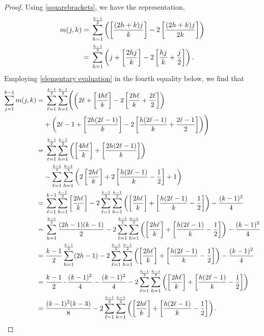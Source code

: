 \documentclass[11pt,reqno]{amsart}
\theoremstyle{plain}
\numberwithin{equation}{section}
\begin{document}
\begin{proof}
 Using \eqref{squarebrackets}, we have the representation,
\begin{align*}%
m(j,k)=&\; \sum_{h=1}^{\frac{k-1}{2}}\left(\left[\frac{(2h+k)j}{k}\right] - 2\left[\frac{(2h+k)j}{2k}\right]\right)\notag\\
=&\; \sum_{h=1}^{\frac{k-1}{2}}\left(j+\left[\frac{2hj}{k}\right] - 2\left[\frac{hj}{k}+\frac{j}{2}\right]\right).
\end{align*}
\allowdisplaybreaks
Employing \eqref{elementary evaluation} in the fourth equality below, we find that
\begin{align}
\sum_{j=1}^{k-1} m(j,k)=&\; \sum_{\ell=1}^{\frac{k-1}{2}}\sum_{h=1}^{\frac{k-1}{2}} \Biggl(\left(2\ell + \left[\frac{4h\ell}{k}\right]- 2\left[\frac{2h\ell}{k}+\frac{2\ell}{2}\right]\right)\notag\\
&+ \left(2\ell -1 + \left[\frac{2h(2\ell-1)}{k}\right]- 2\left[\frac{h(2\ell-1)}{k}+\frac{2\ell-1}{2}\right]\right)\Biggr)\notag\\
=&\; \sum_{\ell=1}^{\frac{k-1}{2}}\sum_{h=1}^{\frac{k-1}{2}} \left(\left[\frac{4h\ell}{k}\right]+\left[\frac{2h(2\ell-1)}{k}\right]\right)\notag \\&- \sum_{\ell=1}^{\frac{k-1}{2}}\sum_{h=1}^{\frac{k-1}{2}}\left(2\left[\frac{2h\ell}{k}\right] + 2\left[\frac{h(2\ell-1)}{k}-\frac{1}{2}\right]+1\right)\notag\\
=&\; \sum_{\ell=1}^{k-1}\sum_{h=1}^{\frac{k-1}{2}}\left[\frac{2h\ell}{k}\right] -   2\sum_{\ell=1}^{\frac{k-1}{2}}\sum_{h=1}^{\frac{k-1}{2}}\left(\left[\frac{2h\ell}{k}\right] + \left[\frac{h(2\ell-1)}{k}-\frac{1}{2}\right]\right) - \frac{(k-1)^2}{4}\notag\\
=&\; \sum_{h=1}^{\frac{k-1}{2}}\frac{(2h-1)(k-1)}{2} -   2\sum_{\ell=1}^{\frac{k-1}{2}}\sum_{h=1}^{\frac{k-1}{2}}\left(\left[\frac{2h\ell}{k}\right] + \left[\frac{h(2\ell-1)}{k}-\frac{1}{2}\right]\right) - \frac{(k-1)^2}{4}\notag\\
=&\; \frac{k-1}{2}\sum_{h=1}^{\frac{k-1}{2}} (2h-1) - 2\sum_{\ell=1}^{\frac{k-1}{2}}\sum_{h=1}^{\frac{k-1}{2}}\left(\left[\frac{2h\ell}{k}\right] + \left[\frac{h(2\ell-1)}{k}-\frac{1}{2}\right]\right) - \frac{(k-1)^2}{4}\notag\\
=&\;\frac{k-1}{2}\cdot \frac{(k-1)^2}{4}- \frac{(k-1)^2}{4}- 2\sum_{\ell=1}^{\frac{k-1}{2}}\sum_{h=1}^{\frac{k-1}{2}}\left(\left[\frac{2h\ell}{k}\right] + \left[\frac{h(2\ell-1)}{k}-\frac{1}{2}\right]\right)\notag\\
=&\; \frac{(k-1)^2(k-3)}{8}- 2\sum_{\ell=1}^{\frac{k-1}{2}}\sum_{h=1}^{\frac{k-1}{2}}\left(\left[\frac{2h\ell}{k}\right] + \left[\frac{h(2\ell-1)}{k}-\frac{1}{2}\right]\right).

\end{align}
\end{proof}
\end{document}
